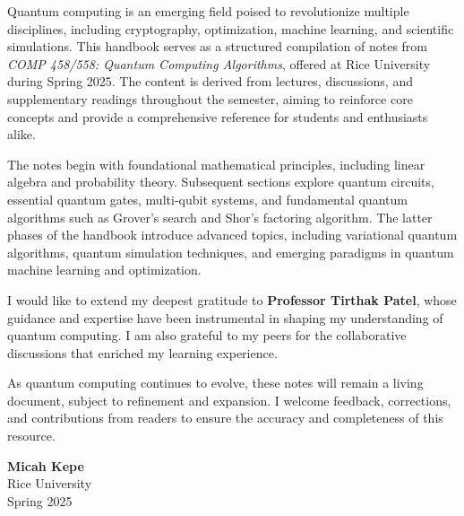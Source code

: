 \bgroup
\setlength{\parindent}{0cm}
\setlength{\parskip}{0.3cm}
Quantum computing is an emerging field poised to revolutionize multiple
disciplines, including cryptography, optimization, machine learning, and
scientific simulations. This handbook serves as a structured compilation of
notes from \textit{COMP 458/558: Quantum Computing Algorithms}, offered at Rice
University during Spring 2025. The content is derived from lectures,
discussions, and supplementary readings throughout the semester, aiming to
reinforce core concepts and provide a comprehensive reference for students
and enthusiasts alike.

The notes begin with foundational mathematical principles, including linear
algebra and probability theory. Subsequent sections explore quantum circuits,
essential quantum gates, multi-qubit systems, and fundamental quantum
algorithms such as Grover’s search and Shor’s factoring algorithm. The latter
phases of the handbook introduce advanced topics, including variational
quantum algorithms, quantum simulation techniques, and emerging paradigms in
quantum machine learning and optimization.

I would like to extend my deepest gratitude to \textbf{Professor Tirthak Patel},
whose guidance and expertise have been instrumental in shaping my
understanding of quantum computing. I am also grateful to my peers for the
collaborative discussions that enriched my learning experience.

As quantum computing continues to evolve, these notes will remain a living
document, subject to refinement and expansion. I welcome feedback,
corrections, and contributions from readers to ensure the accuracy and
completeness of this resource.
\egroup

\vspace{1cm}

\noindent \textbf{Micah Kepe}  \\
Rice University  \\
Spring 2025
